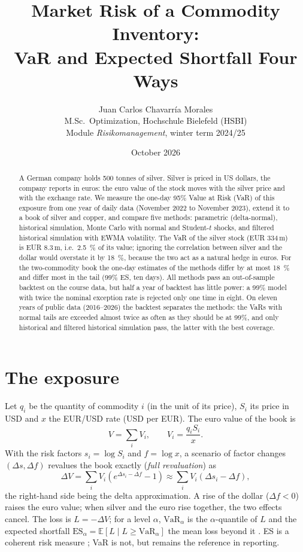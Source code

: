 \documentclass[11pt,a4paper]{article}
\title{Market Risk of a Commodity Inventory:\\ VaR and Expected Shortfall Four Ways}
\author{Juan Carlos Chavarr\'ia Morales\\[2pt]
  \small M.Sc.\ Optimization, Hochschule Bielefeld (HSBI)\\
  \small Module \emph{Risikomanagement}, winter term 2024/25}
\date{October 2026}
\begin{document}
\maketitle

\begin{abstract}
A German company holds 500 tonnes of silver. Silver is priced in US dollars, the company reports in euros: the
euro value of the stock moves with the silver price and with the exchange rate. We measure the one-day 95\% Value
at Risk (VaR) of this exposure from one year of daily data (November 2022 to November 2023), extend it to a book of
silver and copper, and compare five methods: parametric (delta-normal), historical simulation, Monte Carlo with
normal and Student-$t$ shocks, and filtered historical simulation with EWMA volatility. The VaR of the silver stock
(EUR 334\,m) is EUR 8.3\,m, i.e.\ \SI{2.5}{\percent} of its value; ignoring the correlation between silver and the
dollar would overstate it by \SI{18}{\percent}, because the two act as a natural hedge in euros. For the two-commodity
book the one-day estimates of the methods differ by at most \SI{18}{\percent} and differ most in the tail (99\% ES, ten
days). All methods pass an out-of-sample backtest on the course data, but half a year of backtest has little power: a
99\% model with twice the nominal exception rate is rejected only one time in eight. On eleven years of public data
(2016--2026) the backtest separates the methods: the VaRs with normal tails are exceeded almost twice as often as
they should be at 99\%, and only historical and filtered historical simulation pass, the latter with the best
coverage.
\end{abstract}

\section{The exposure}

Let $q_i$ be the quantity of commodity $i$ (in the unit of its price), $S_i$ its price in USD and $x$ the EUR/USD
rate (USD per EUR). The euro value of the book is
\begin{equation}
  V = \sum_i V_i, \qquad V_i = \frac{q_i S_i}{x}.
\end{equation}
With the risk factors $s_i = \log S_i$ and $f = \log x$, a scenario of factor changes $(\Delta s, \Delta f)$
revalues the book exactly (\emph{full revaluation}) as
\begin{equation}
  \Delta V = \sum_i V_i \left( e^{\Delta s_i - \Delta f} - 1 \right) \approx \sum_i V_i(\Delta s_i - \Delta f),
\end{equation}
the right-hand side being the delta approximation. A rise of the dollar ($\Delta f < 0$) raises the euro value; when
silver and the euro rise together, the two effects cancel. The loss is $L = -\Delta V$; for a level $\alpha$,
$\mathrm{VaR}_\alpha$ is the $\alpha$-quantile of $L$ and the expected shortfall
$\mathrm{ES}_\alpha = \mathbb E[L \mid L \ge \mathrm{VaR}_\alpha]$ the mean loss beyond it \citep{McNeil2015}. ES is a
coherent risk measure \citep{Artzner1999}; VaR is not, but remains the reference in reporting.
\end{document}
